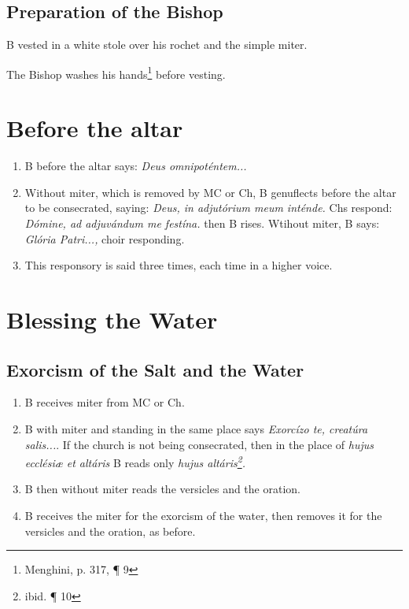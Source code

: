 \documentclass[twocolumn]{report}
\begin{document}
\subsection*{Preparation of the Bishop}

B vested in a white stole over his rochet and the simple miter. 

The Bishop washes his hands\footnote{Menghini, p. 317, \P{} 9} before vesting.

\section*{Before the altar}
\begin{enumerate}
	\item B before the altar says: \textit{Deus omnipoténtem...}
	\item Without miter, which is removed by MC or Ch, B genuflects before the altar to be consecrated, saying: \textit{Deus, in adjutórium meum inténde.} Chs respond: \textit{Dómine, ad adjuvándum me festína.} then B rises. Wtihout miter, B says: \textit{Glória Patri...,} choir responding.
	\item This responsory is said three times, each time in a higher voice.
\end{enumerate}
\section*{Blessing the Water}
\subsection*{Exorcism of the Salt and the Water}
\begin{enumerate}
	\item B receives miter from MC or Ch.
	\item B with miter and standing in the same place says \textit{Exorcízo te, creatúra salis...}. If the church is not being consecrated, then in the place of \textit{hujus ecclésiæ et altáris} B reads only \textit{hujus altáris\footnote{ibid. \P{} 10}.}
	\item B then without miter reads the versicles and the oration.
	\item B receives the miter for the exorcism of the water, then removes it for the versicles and the oration, as before.
\end{enumerate}
\end{document}
